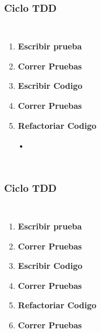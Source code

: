 \documentclass{beamer}
\begin{document}
\begin{frame}
\frametitle{Ciclo TDD}
\begin{columns}[c] %

\begin{enumerate}
\item \textbf{Escribir prueba}
\item {\color{red}\textbf{Correr Pruebas}}
\item \textbf{Escribir Codigo}
\item {\color{green}\textbf{Correr Pruebas}}
\item \textbf{Refactoriar Codigo}
\item[•]	
\end{enumerate}

\end{columns}
\end{frame}

\begin{frame}
\frametitle{Ciclo TDD}
\begin{columns}[c] %

\begin{enumerate}
\item \textbf{Escribir prueba}
\item {\color{red}\textbf{Correr Pruebas}}
\item \textbf{Escribir Codigo}
\item {\color{green}\textbf{Correr Pruebas}}
\item \textbf{Refactoriar Codigo}
\item {\color{purple}\textbf{Correr Pruebas}}
\end{enumerate}

\end{columns}
\end{frame}
\end{document}

